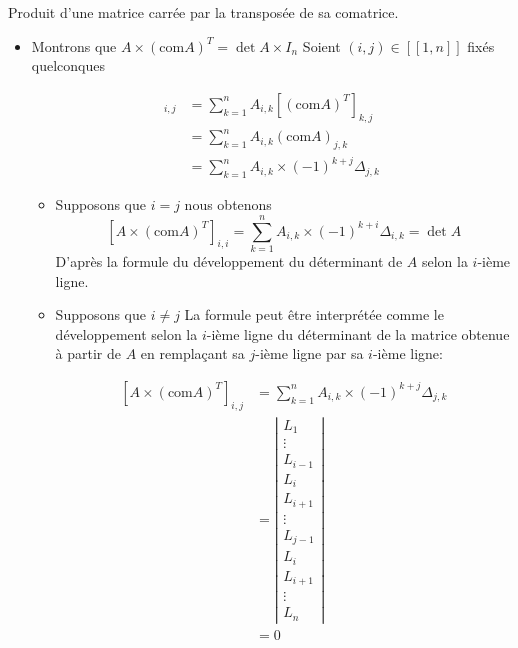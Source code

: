 \documentclass{article}
\renewenvironment{question_kholle}[2][ ]
{
	\subsection{\texorpdfstring{#2}{}}
	\notblank{#1}
	{
		\noindent #1
		\bigbreak
	}
	{}
	\begin{proof}
}
{
	\end{proof}
}
\begin{document}
\begin{question_kholle}[{Soit $A \in \mathcal{M}_{n}(\K)$.
    Alors $A \times (\mathrm{com} A)^{T} = (\mathrm{com}A)^{T}\times A = \det A \times I_{n}$
    }]{Produit d'une matrice carrée par la transposée de sa comatrice.}
    
    \begin{itemize}[label=$\lozenge$]
        \item Montrons que $A \times (\mathrm{com}A)^{T}=\det A \times I_{n}$
        Soient $(i, j) \in [ \! [ 1, n ] \!]$ fixés quelconques
        
        \begin{align*}
            [A \times (\mathrm{com}A)^{T}]_{i,j} &= \sum_{k=1}^{n}A_{i,k}[(\mathrm{com}A)^{T}]_{k,j} \\
            &=\sum_{k=1}^{n}A_{i,k}(\mathrm{com}A)_{j,k} \\
            &= \sum _{k=1}^{n}A_{i,k}\times (-1)^{k+j}\Delta_{j,k}
        \end{align*}
        
        \begin{itemize}[label=$\star$]
            \item Supposons que $i = j$ nous obtenons
$$
            [A\times(\mathrm{com}A)^{T}]_{i,i} = \sum_{k=1}^{n}A_{i,k}\times(-1)^{k+i}\Delta_{i,k} = \det A
$$
            D'après la formule du développement du déterminant de $A$ selon la $i$-ième ligne.
            
            \item Supposons que $i \neq j$
            La formule peut être interprétée comme le développement selon la $i$-ième ligne du déterminant de la matrice obtenue à partir de $A$ en remplaçant sa $j$-ième ligne par sa $i$-ième ligne:
            
            \begin{align*}
                \left[ A\times (\mathrm{com}A)^{T} \right] _{i,j} &= \sum_{k=1}^{n}A_{i,k}\times(-1)^{k+j}\Delta_{j,k} \\
                &=\left| \begin{array}{c}
                    L_{1} \\
                    \hline 
                    \vdots \\
                    \hline
                    L_{i-1} \\
                    \hline 
                    L_{i} \\
                    \hline L_{i+1} \\
                    \hline \vdots \\
                    \hline L_{j-1} \\
                    \hline L_{i} \\
                    \hline L_{i+1} \\
                    \hline \vdots \\
                    \hline L_{n}
                \end{array} \right|  \\
                &=0
            \end{align*}
            

\end{itemize}
\end{itemize}
\end{question_kholle}
\end{document}

